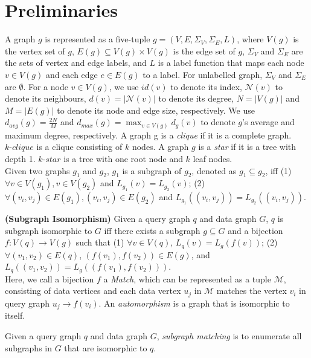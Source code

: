 \section{Preliminaries}
\label{sec:prelim}
A graph $g$ is represented as a five-tuple $g=(V, E, \Sigma_V,\Sigma_E, L)$, where $V(g)$ is the vertex set of $g$, $E(g) \subseteq V(g) \times V(g)$ is the edge set of $g$, $\Sigma_V$ and $\Sigma_E$ are the sets of vertex and edge labels, and $L$ is a label function that maps each node $v\in V(g)$ and each edge $e \in E(g)$ to a label. For unlabelled graph, $\Sigma_V$ and $\Sigma_E$ are $\emptyset$. For a node $v\in V(g)$, we use $id(v)$ to denote its index, $\mathcal{N}(v)$ to denote its neighbours, $d(v)=|\mathcal{N}(v)|$ to denote its degree, $N=|V(g)|$ and  $M=|E(g)|$ to denote its node and edge size, respectively. We use $d_{avg}(g) = \frac{2N}{M}$ and $d_{max}(g) = \max_{v\in V(g)}d_g(v)$ to denote $g$'s average and maximum degree, respectively. A graph g is a \textit{clique} if it is a complete graph. $k\text{-}clique$ is a clique consisting of $k$ nodes. A graph $g$ is a \textit{star} if it is a tree with depth 1. $k\text{-}star$ is a tree with one root node and $k$ leaf nodes.\\

Given two graphs $g_1$ and $g_2$, $g_1$ is a subgraph of $g_2$, denoted as $g_1 \subseteq g_2$, iff (1) $\forall v\in V(g_1), v\in V(g_2)$ and $L_{g_1}(v)=L_{g_2}(v)$; (2) $\forall (v_i,v_j)\in E(g_1), (v_i,v_j)\in E(g_2)$ and $L_{g_1}((v_i,v_j))=L_{g_2}((v_i,v_j))$.\\

\begin{definition}
\label{def:isomorphism}{\textbf{(Subgraph Isomorphism)}} Given a query graph $q$ and data graph $G$, $q$ is subgraph isomorphic to $G$ iff there exists a subgraph $g\subseteq G$ and a bijection $f: V(q) \rightarrow V(g)$ such that (1) $\forall v \in V(q)$, $L_q(v) = L_{g}(f(v))$; (2) $\forall (v_1, v_2) \in E(q)$, $(f(v_1), f(v_2)) \in E(g)$, and $L_q((v_1, v_2)) = L_{g}((f(v_1), f(v_2)))$. \\

Here, we call a bijection $f$ a \textit{Match}, which can be represented as a tuple $\mathcal{M}$, consisting of data vertices and each data vertex $u_j$ in $\mathcal{M}$ matches the vertex $v_i$ in query graph $u_j \rightarrow f(v_i)$. An \textit{automorphism} is a graph that is isomorphic to itself.
\end{definition}

 Given a query graph $q$ and data graph $G$, \textit{subgraph matching} is to enumerate all subgraphs in $G$ that are isomorphic to $q$.\\

